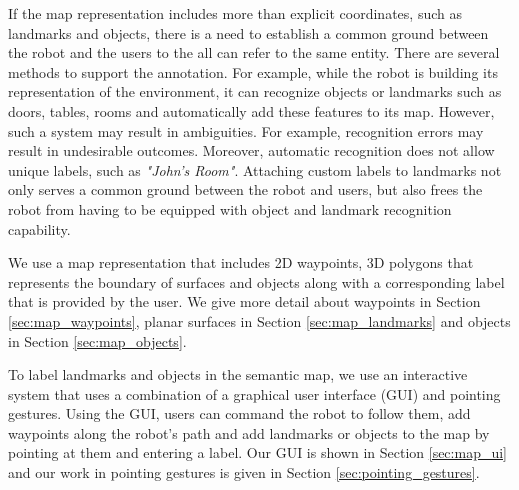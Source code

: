 \documentclass[12pt]{gatech-thesis}
\begin{document}
If the map representation includes more than explicit coordinates, such as landmarks and objects, there is a need to establish a common ground between the robot and the users to the all can refer to the same entity. There are several methods to support the annotation. For example, while the robot is building its representation of the environment, it can recognize objects or landmarks such as doors, tables, rooms and automatically add these features to its map. However, such a system may result in ambiguities. For example, recognition errors may result in undesirable outcomes. Moreover, automatic recognition does not allow unique labels, such as \textit{"John's Room"}. Attaching custom labels to landmarks not only serves a common ground between the robot and users, but also frees the robot from having to be equipped with object and landmark recognition capability.


We use a map representation that includes 2D waypoints, 3D polygons that represents the boundary of surfaces and objects along with a corresponding label that is provided by the user. We give more detail about waypoints in Section \ref{sec:map_waypoints}, planar surfaces in Section \ref{sec:map_landmarks} and objects in Section \ref{sec:map_objects}.

To label landmarks and objects in the semantic map, we use an interactive system that uses a combination of a graphical user interface (GUI) and pointing gestures. Using the GUI, users can command the robot to follow them, add waypoints along the robot's path and add landmarks or objects to the map by pointing at them and entering a label. Our GUI is shown in Section \ref{sec:map_ui} and our work in pointing gestures is given in Section \ref{sec:pointing_gestures}.





\end{document}
